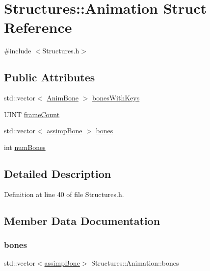 \hypertarget{struct_structures_1_1_animation}{}\section{Structures\+:\+:Animation Struct Reference}
\label{struct_structures_1_1_animation}


{\ttfamily \#include $<$Structures.\+h$>$}

\subsection*{Public Attributes}
\begin{DoxyCompactItemize}
\item 
std\+::vector$<$ \mbox{\hyperlink{struct_structures_1_1_anim_bone}{Anim\+Bone}} $>$ \mbox{\hyperlink{struct_structures_1_1_animation_a6726c126620084018287d0f9211db2b8}{bones\+With\+Keys}}
\item 
U\+I\+NT \mbox{\hyperlink{struct_structures_1_1_animation_a6701a71d078aa9490e0f657e60d01735}{frame\+Count}}
\item 
std\+::vector$<$ \mbox{\hyperlink{struct_structures_1_1assimp_bone}{assimp\+Bone}} $>$ \mbox{\hyperlink{struct_structures_1_1_animation_ab92c2dd1ec645c3c888f352ceb1ce260}{bones}}
\item 
int \mbox{\hyperlink{struct_structures_1_1_animation_af5ffea13b6ba8d935ee36e0fb2879587}{num\+Bones}}
\end{DoxyCompactItemize}


\subsection{Detailed Description}


Definition at line 40 of file Structures.\+h.



\subsection{Member Data Documentation}
\mbox{\label{struct_structures_1_1_animation_ab92c2dd1ec645c3c888f352ceb1ce260}} 
\subsubsection{\texorpdfstring{bones}{bones}}
{\footnotesize\ttfamily std\+::vector$<$\mbox{\hyperlink{struct_structures_1_1assimp_bone}{assimp\+Bone}}$>$ Structures\+::\+Animation\+::bones}



